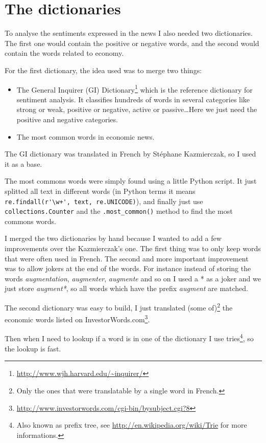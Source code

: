 \documentclass[12pt]{report}
\begin{document}
		\section{The dictionaries}
		
			To analyse the sentiments expressed in the news I also needed two dictionaries. The first one would contain the positive or negative words, and the second would contain the words related to economy.
			
			For the first dictionary, the idea used was to merge two things:
			\begin{itemize}
				\item The General Inquirer (GI) Dictionary\footnote{\url{http://www.wjh.harvard.edu/~inquirer/}} which is the reference dictionary for sentiment analysis. It classifies hundreds of words in several categories like strong or weak, positive or negative, active or passive\ldots Here we just need the positive and negative categories.
				\item The most common words in economic news.
			\end{itemize}
			
			The GI dictionary was translated in French by Stéphane Kazmierczak, so I used it as a base.
			
			The most commons words were simply found using a little Python script. It just splitted all text in different words (in Python terms it means \lstinline!re.findall(r'\w+', text, re.UNICODE)!), and finally just use \lstinline!collections.Counter! and the \lstinline!.most_common()! method to find the most commons words.
			
			I merged the two dictionaries by hand because I wanted to add a few improvements over the Kazmierczak's one. The first thing was to only keep words that were often used in French. The second and more important improvement was to allow jokers at the end of the words. For instance instead of storing the words \emph{augmentation}, \emph{augmenter}, \emph{augmente} and so on I used a * as a joker and we just store \emph{augment*}, so all words which have the prefix \emph{augment} are matched.
			
			The second dictionary was easy to build, I just translated (some of)\footnote{Only the ones that were translatable by a single word in French.} the economic words listed on InvestorWords.com\footnote{\url{http://www.investorwords.com/cgi-bin/bysubject.cgi?8}}.
			
			Then when I need to lookup if a word is in one of the dictionary I use tries\footnote{Also known as prefix tree, see \url{http://en.wikipedia.org/wiki/Trie} for more informations.}, so the lookup is fast.
			
\end{document}
